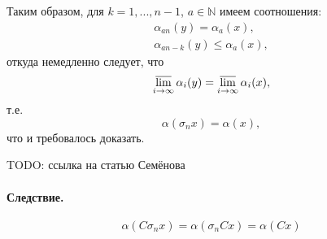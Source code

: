 Таким образом, для $k=1, ..., n-1$, $a\in\mathbb{N}$ имеем соотношения:
\begin{gather}
	\alpha_{an}(y) = \alpha_a(x),
\\
	\alpha_{an-k}(y) \leqslant \alpha_a(x),
\end{gather}
откуда немедленно следует, что
\begin{equation}
	\varlimsup_{i\to\infty} \alpha_i(y) =
	\varlimsup_{i\to\infty} \alpha_i(x),
\end{equation}
т.е.
\begin{equation}
	\alpha(\sigma_n x) = \alpha(x),
\end{equation}
что и требовалось доказать.

TODO: ссылка на статью Семёнова

\paragraph{Следствие.}
$$
	\alpha(C\sigma_n x) =
	\alpha(\sigma_n Cx) =
	\alpha(Cx)
$$
